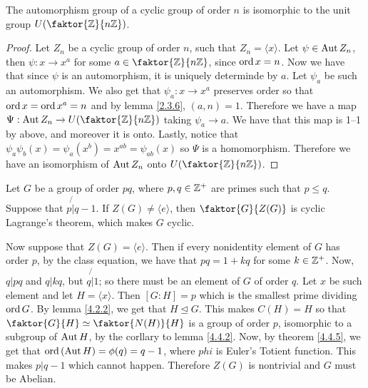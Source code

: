 \begin{theorem}\label{4.4.5}
    The automorphism group of a cyclic group of order $n$ is isomorphic to the
    unit group $U(\faktor{\Z}{n\Z})$.
\end{theorem}
\begin{proof}
    Let $Z_n$ be a cyclic group of order $n$, such that $Z_n=\langle x \rangle$.
    Let $\psi \in \operatorname{Aut}{Z_n}$, then $\psi:x \xrightarrow{} x^a$ for some $a \in
    \faktor{\Z}{n\Z}$, since $\operatorname{ord}{x}=n$. Now we have that since $\psi$ is an
    automorphism, it is uniquely determinde by $a$. Let $\psi_a$ be such an
    automorphism. We also get that  $\psi_a:x \xrightarrow{} x^a$ preserves
    order so that $\operatorname{ord}{x}=\operatorname{ord}{x^a}=n$ and by lemma \ref{2.3.6}, $(a,n)=1$.
    Therefore we have a map $\Psi:\Aut{Z_n} \xrightarrow{} U(\faktor{\Z}{n\Z})$
    taking $\psi_a \xrightarrow{} a$. We have that this map is 1--1 by above,
    and moreover it is onto. Lastly, notice that
    $\psi_a\psi_b(x)=\psi_a(x^b)=x^{ab}=\psi_{ab}(x)$ so $\Psi$ is a
    homomorphism. Therefore we have an isomorphism of $\operatorname{Aut}{Z_n}$ onto
    $U(\faktor{\Z}{n\Z})$.
\end{proof}

\begin{example}\label{}
    Let $G$ be a group of order $pq$, where $p,q \in \mathbb{Z}^+$ are primes such that
     $p \leq q$. Suppose that  $p \not{|} q-1$. If $Z(G) \neq \langle e
     \rangle$, then $\faktor{G}{Z(G)}$ is cyclic Lagrange's theorem, which makes
     $G$ cyclic.

     Now suppose that $Z(G)=\langle e \rangle$. Then if every nonidentity
     element of $G$ has order  $p$, by the class equation, we have that
     $pq=1+kq$ for some  $k \in \mathbb{Z}^+$. Now,  $q|pq$ and  $q|kq$, but  $q \not{|}
     1$; so there must be an element of $G$ of order $q$. Let $x$ be such
     element and let  $H=\langle x \rangle$. Then $[G:H]=p$ which is the
     smallest prime dividing $\operatorname{ord}{G}$. By lemma \ref{4.2.2}, we get that $H
     \unlhd G$. This makes  $C(H)=H$ so that $\faktor{G}{H} \simeq
     \faktor{N(H)}{H}$ is a group of order $p$, isomorphic to a subgroup of
     $\operatorname{Aut}{H}$, by the corllary to lemma \ref{4.4.2}. Now, by theorem
     \ref{4.4.5}, we get that $\operatorname{ord}{(\operatorname{Aut}{H})}=\phi(q)=q-1$, where $phi$ is
     Euler's Totient function. This makes $p|q-1$ which cannot happen. Therefore
      $Z(G)$ is nontrivial and $G$ must be Abelian.
\end{example}


